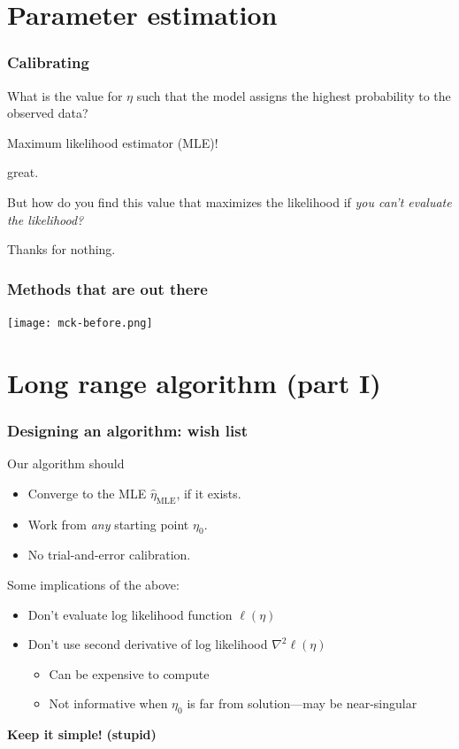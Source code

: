 \documentclass[slidestop,compress, 10pt]{beamer}
\newcommand{\etaMLE}{\hat{\eta}_{\textrm{MLE}}}
\begin{document}
\section{Parameter estimation}
\frame
{
\frametitle{Calibrating}
What is the value for $\eta$ such that the model assigns the highest probability to the observed data?
\vspace{2mm}

Maximum likelihood estimator (MLE)!
\vspace{2mm}

great.
\vspace{2mm}

But how do you find this value that maximizes the likelihood if \emph{you can't evaluate the likelihood?}
\vspace{2mm}

Thanks for nothing.
}

\frame
{
\frametitle{Methods that are out there}
\begin{center} 
\texttt{[image: mck-before.png]}
\end{center} 
}
\section{Long range algorithm (part I)}
\frame
{
\frametitle{Designing an algorithm: wish list}

Our algorithm should
\begin{itemize}
\item Converge to the MLE $\etaMLE$, if it exists.
\item Work from \emph{any} starting point $\eta_0$.
\item No trial-and-error calibration.
\end{itemize}
\vspace{2mm}

\pause
Some implications of the above:
\begin{itemize}
\item Don't evaluate log likelihood function $\ell( \eta)$
\item Don't use second derivative of log likelihood $\nabla^2 \ell( \eta)$
\begin{itemize}
	\item Can be expensive to compute
	\item Not informative when $\eta_0$ is far from solution---may be near-singular
\end{itemize}
\end{itemize}
\textbf{Keep it simple!} \pause \textbf{(stupid)}
}
\end{document}

